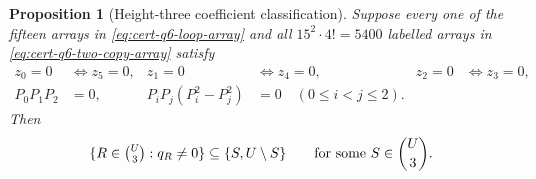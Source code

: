 \documentclass[11pt,letterpaper,onecolumn]{article}
\theoremstyle{plain}
\newtheorem{proposition}[proposition]{Proposition}
\theoremstyle{definition}
\theoremstyle{remark}
\begin{document}
	\begin{proposition}[Height-three coefficient classification]
		\label{prop:cert-high-charge-q6-joint-deck}
		Suppose every one of the fifteen arrays in
		\cref{eq:cert-q6-loop-array} and all
		\(15^2\cdot4!=5400\) labelled arrays in
		\cref{eq:cert-q6-two-copy-array} satisfy
		\begin{align}
			z_0=0&\Longleftrightarrow z_5=0,&
			z_1=0&\Longleftrightarrow z_4=0,&
			z_2=0&\Longleftrightarrow z_3=0,
			\label{eq:cert-q6-zero-pairs}\\
			P_0P_1P_2&=0,&
			P_iP_j(P_i^2-P_j^2)&=0\quad(0\le i<j\le2).
			\label{eq:cert-q6-pair-products}
		\end{align}
		Then
		\[
		\{R\in\tbinom U3:q_R\ne0\}\subseteq\{S,U\setminus S\}
		\qquad\text{for some }S\in\binom U3.
		\]
	\end{proposition}
	
\end{document}

